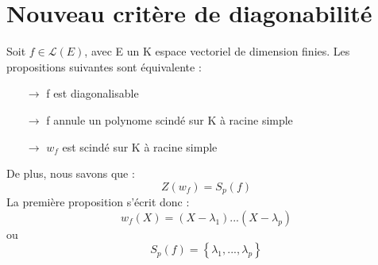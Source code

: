 \section{Nouveau critère de diagonabilité}
\begin{theo}
Soit $f \in \mathcal{L}(E)$, avec E un K espace vectoriel de dimension finies. Les propositions suivantes sont équivalente : 
\begin{itemize}
 \item[$\rightarrow$] f est diagonalisable
 \item[$\rightarrow$] f annule un polynome scindé sur K à racine simple
 \item[$\rightarrow$] $w_f$ est scindé sur K à racine simple
\end{itemize}
De plus, nous savons que : 
$$Z(w_f) = S_p(f)$$
La première proposition s'écrit donc : 
$$w_f(X) = (X-\lambda_1)...(X-\lambda_p)$$
ou 
$$S_p(f) = \left\lbrace \lambda_1,...,\lambda_p\right\rbrace $$
\end{theo}

